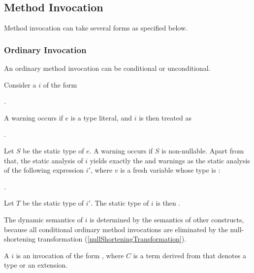 \documentclass[makeidx]{article}
\begin{document}
{\subsection{Method Invocation}

\LMHash{}%
Method invocation can take several forms as specified below.


\subsubsection{Ordinary Invocation}

\LMHash{}%
An ordinary method invocation can be conditional or unconditional.

\LMHash{}%
Consider a
%
$i$ of the form

\noindent
{}.


\LMHash{}%
A warning occurs if $e$ is a type literal,
and $i$ is then treated as

\noindent
{}.

\LMHash{}%
Let $S$ be the static type of $e$.
A warning occurs if $S$ is non-nullable.
Apart from that,
the static analysis of $i$ yields
exactly the  and warnings as
the static analysis of the following expression $i'$,
where $v$ is a fresh variable whose type is :

\noindent
{}.

\noindent
Let $T$ be the static type of $i'$.
The static type of $i$ is then .

\LMHash{}%
The dynamic semantics of $i$ is determined by the semantics of other constructs,
because all conditional ordinary method invocations are eliminated by the
null-shortening transformation
(\ref{nullShorteningTransformation}).
\EndCase

\LMHash{}%
A 
$i$ is an invocation of the form
%
,
where $C$ is a term derived from 
that denotes a type or an extension.

}
\end{document}
